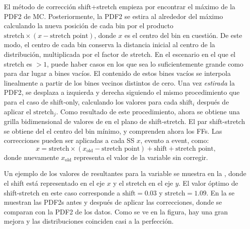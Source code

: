 El método de corrección shift+stretch empieza por encontrar el máximo de la \ac{PDF2} de \ac{MC}. Posteriormente, la \ac{PDF2} se estira al alrededor del m\'aximo calculando la nueva posición de cada bin por el producto \(\text{stretch}\times (x - \text{stretch point})\), donde \(x\) es el centro del bin en cuesti\'on. De este modo, el centro de cada bin conserva la distancia inicial al centro de la distribución, multiplicada por el factor de stretch. En el escenario en el que el stretch es \(>1\), puede haber casos en los que sea lo suficientemente grande como para dar lugar a bines vacíos. El contenido de estos bines vacíos se interpola linealmente a partir de los bines vecinos distintos de cero.
Una vez \textit{estirada} la \ac{PDF2}, se desplaza a izquierda y derecha siguiendo el mismo procedimiento que para el caso de shift-only, calculando los valores \chisq para cada \(\text{shift}_i\) después de aplicar el \(\text{stretch}_j\). Como resultado de este procedimiento, ahora se obtiene una grilla bidimensional de valores de \chisq en el plano de shift-stretch. El par shift-stretch se obtiene del el centro del bin mínimo, y comprenden ahora los \acp{FF}. Las correcciones pueden ser aplicadas a cada \ac{SS} \(x\), evento a event, como:
\begin{equation}
	x = \text{stretch}\times(x_{\text{old}} - \text{stretch point}) + \text{shift} + \text{stretch point},
\end{equation}
donde nuevamente \(x_\text{old}\) representa el valor de la variable sin corregir.

Un ejemplo de los valores de \chisq resultantes para la variable \fside se muestra en la \Fig{\ref{fig:ss_corrections:ffs:calculation:fside_calculation:chi2}}, donde el shift est\'a representado en el eje \(x\) y el stretch en el eje \(y\). El valor óptimo de shift-stretch en este caso corresponde a \(\text{shift}=0.03\) y \(\text{stretch}=1.09\). En la \Fig{\ref{fig:ss_corrections:ffs:calculation:fside_calculation:pdfs}} se muestran las \acp{PDF2} antes y después de aplicar las correcciones, donde se comparan con la \ac{PDF2} de los datos. Como se ve en la figura, hay una gran mejora y las distribuciones coinciden casi a la perfección.

